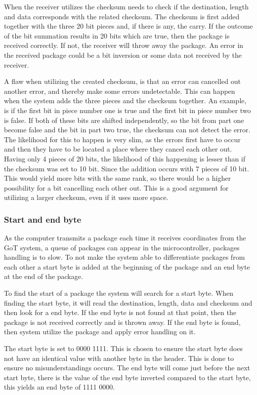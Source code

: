 When the receiver utilizes the checksum needs to check if the destination, length and data corresponds with the related checksum. The checksum is first added together with the three 20 bit pieces and, if there is any, the carry. If the outcome of the bit summation results in 20 bits which are true, then the package is received correctly. If not, the receiver will throw away the package. An error in the received package could be a bit inversion or some data not received by the receiver. 

A flaw when utilizing the created checksum, is that an error can cancelled out another error, and thereby make some errors undetectable. This can happen when the system adds the three pieces and the checksum together. An example, is if the first bit in piece number one is true and the first bit in piece number two is false. If both of these bits are shifted independently, so the bit from part one become false and the bit in part two true, the checksum can not detect the error. The likelihood for this to happen is very slim, as the errors first have to occur and then they have to be located a place where they cancel each other out. Having only 4 pieces of 20 bits, the likelihood of this happening is lesser than if the checksum was set to 10 bit. Since the addition occurs with 7 pieces of 10 bit. This would yield more bits with the same rank, so there would be a higher possibility for a bit cancelling each other out. This is a good argument for utilizing a larger checksum, even if it uses more space.

\subsubsection{Start and end byte}
As the computer transmits a package each time it receives coordinates from the GoT system, a queue of packages can appear in the microcontroller, packages handling is to slow. To not make the system able to differentiate packages from each other a start byte is added at the beginning of the package and an end byte at the end of the package. 

To find the start of a package the system will search for a start byte. When finding the start byte, it will read the destination, length, data and checksum and then look for a end byte. If the end byte is not found at that point, then the package is not received correctly and is thrown away. If the end byte is found, then system utilize the package and apply error handling on it. 

The start byte is set to 0000 1111. This is chosen to ensure the start byte does not have an identical value with another byte in the header. This is done to ensure no misunderstandings occurs. The end byte will come just before the next start byte, there is the value of the end byte inverted compared to the start byte, this yields an end byte of 1111 0000.

